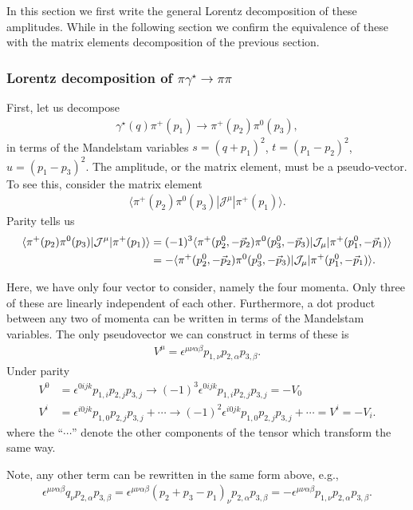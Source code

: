 In this section we first write the general Lorentz decomposition of these amplitudes. While in the following section we confirm the equivalence of these with the matrix elements decomposition of the previous section. 

\subsubsection{Lorentz decomposition of $\pi\gamma^\star\to\pi\pi$}
{} 


First, let us decompose 
\begin{align}
\gamma^\star(q)\pi^+(p_1)\to\pi^+(p_2)\pi^0(p_3),
\end{align}
in terms of the Mandelstam variables $s=(q+p_1)^2$, $t=(p_1-p_2)^2$, $u=(p_1-p_3)^2$. The amplitude, or the matrix element, must be a pseudo-vector. To see this, consider the matrix element
\begin{align}
\langle \pi^+(p_2)\pi^0(p_3)|\mathcal{J}^\mu|\pi^+(p_1)\rangle.
\end{align}
Parity tells us 
\begin{align}
\langle \pi^+(p_2)\pi^0(p_3)|\mathcal{J}^\mu|\pi^+(p_1)\rangle
&=
(-1)^3\langle \pi^+(p_2^0,-\vec{p}_2)\pi^0(p_3^0,-\vec{p}_3)|\mathcal{J}_\mu|\pi^+(p_1^0,-\vec{p}_1)\rangle
\nonumber\\
&=
-\langle \pi^+(p_2^0,-\vec{p}_2)\pi^0(p_3^0,-\vec{p}_3)|\mathcal{J}_\mu|\pi^+(p_1^0,-\vec{p}_1)\rangle.
\end{align} 

Here, we have only four vector to consider, namely the four momenta. Only three of these are linearly independent of each other. Furthermore, a dot product between any two of momenta can be written in terms of the Mandelstam variables. The only pseudovector we can construct in terms of these is 
\begin{align}
V^\mu=\epsilon^{\mu\nu\alpha\beta}p_{1,\nu}p_{2,\alpha}p_{3,\beta}.
\end{align}
Under parity
\begin{align}
V^0&=\epsilon^{0ijk}p_{1,i}p_{2,j}p_{3,j}\to
(-1)^3\epsilon^{0ijk}p_{1,i}p_{2,j}p_{3,j}=-V_0\\
V^i&=\epsilon^{i0jk}p_{1,0}p_{2,j}p_{3,j}+\cdots\to
(-1)^2\epsilon^{i0jk}p_{1,0}p_{2,j}p_{3,j}+\cdots=V^i=-V_i.
\end{align}
where the ``$\cdots$'' denote the other components of the tensor which transform the same way. 

Note, any other term can be rewritten in the same form above, e.g.,
\begin{align}
\epsilon^{\mu\nu\alpha\beta}q_{\nu}p_{2,\alpha}p_{3,\beta}
=\epsilon^{\mu\nu\alpha\beta}(p_{2}+p_{3}-p_{1})_{\nu}p_{2,\alpha}p_{3,\beta}
=-\epsilon^{\mu\nu\alpha\beta}p_{1,\nu}p_{2,\alpha}p_{3,\beta}.
\end{align}

